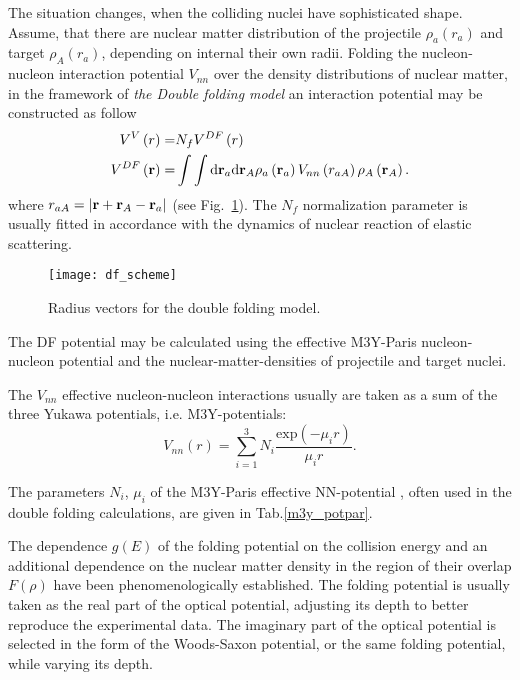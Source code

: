 \documentclass[
12pt, %
oneside, %
english, %
onehalfspacing, %
onehalfspacing, %
headsepline, %
]{MastersDoctoralThesis} %
\begin{document}
The situation changes, when the colliding nuclei have sophisticated shape. Assume, that there are nuclear matter distribution of the projectile $\rho_a \left( { r}_a \right) $ and target $\rho_A \left( { r}_a \right)$, depending on internal their own radii. Folding the nucleon-nucleon interaction potential $V_{nn}$ over the density distributions of nuclear matter, in the framework of \textit{the Double folding model} an interaction potential may be constructed as follow 
\begin{align}
V^V\left( r \right) = & N_f V^{DF} \left( r \right) \nonumber \\ 
V^{DF} \left( {\bf r} \right) = & \int \int \text{d} {\bf r}_a\text{d} {\bf r}_A
\rho_a \left( {\bf r}_a \right) V_{nn} \left( r_{aA}\right)  \rho_A \left( {\bf r}_A \right). 
\label{df_potential}
\end{align}
where $r_{aA}=\vert {\bf r} + {\bf r}_A - {\bf r}_a \vert$ (see Fig.~\ref{fig:df_scheme}). The $N_f$ normalization parameter is usually fitted in accordance with the dynamics of nuclear reaction of elastic scattering.

\begin{figure}
\centering
\texttt{[image: df\_scheme]}
\decoRule
\caption{ \footnotesize Radius vectors for the double folding model. }
\label{fig:df_scheme}
\end{figure}

The DF potential may be calculated using the effective M3Y-Paris \cite{anantaraman1983effective} nucleon-nucleon potential and the nuclear-matter-densities of projectile and target nuclei. 

 The $V_{nn}$ effective nucleon-nucleon interactions usually are taken as a sum of the three Yukawa potentials, i.e. M3Y-potentials:
 \begin{equation}
 V_{nn}(r)=\sum_{i=1}^{3} N_i \frac{\text{exp}(-\mu_i r)}{\mu_i r}.
 \end{equation}
 
 
The parameters  $N_i$, $\mu_i$ of the M3Y-Paris effective NN-potential \cite{anantaraman1983effective}, often used in the double folding calculations, are given in Tab.\ref{m3y_potpar}.

The dependence $g(E)$ of the folding potential on the collision energy and an additional dependence on the nuclear matter density in the region of their overlap $F(\rho)$ have been phenomenologically established. The folding potential is usually taken as the real part of the optical potential, adjusting its depth to better reproduce the experimental data. The imaginary part of the optical potential is selected in the form of the Woods-Saxon potential, or the same folding potential, while varying its depth.
\end{document}
